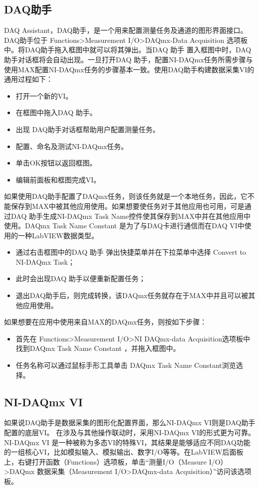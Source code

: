 \subsection{DAQ助手}
DAQ Assistant，DAQ助手，是一个用来配置测量任务及通道的图形界面接口。DAQ助手位于 Functions>Measurement I/O>DAQmx-Data Acquisition 选项板中。将DAQ助手拖入框图中就可以将其弹出。当DAQ 助手 置入框图中时，DAQ助手对话框将会自动出现。一旦打开DAQ 助手，配置NI-DAQmx任务所需步骤与使用MAX配置NI-DAQmx任务的步骤基本一致。使用DAQ助手构建数据采集VI的通用过程如下：
\begin{itemize}
\item 打开一个新的VI。
\item 在框图中拖入DAQ 助手。
\item 出现 DAQ助手对话框帮助用户配置测量任务。
\item 配置、命名及测试NI-DAQmx任务。
\item 单击OK按钮以返回框图。
\item 编辑前面板和框图完成VI。
\end{itemize}

如果使用DAQ助手配置了DAQmx任务，则该任务就是一个本地任务，因此，它不能保存到MAX中被其他应用使用。如果想要使任务对于其他应用也可用，可是通过DAQ 助手生成NI-DAQmx Task Name控件使其保存到MAX中并在其他应用中使用。DAQmx Task Name Constant 是为了与DAQ卡进行通信而在DAQ VI中使用的一种LabVIEW数据类型。

\begin{itemize}
\item 通过右击框图中的DAQ 助手 弹出快捷菜单并在下拉菜单中选择 Convert to NI-DAQmx Task；
\item 此时会出现DAQ 助手以便重新配置任务；
\item 退出DAQ助手后，则完成转换，该DAQmx任务就存在于MAX中并且可以被其他应用使用。
\end{itemize}

如果想要在应用中使用来自MAX的DAQmx任务，则按如下步骤：
\begin{itemize}
\item 首先在 Functions>Measurement I/O>NI DAQmx-data Acquisition选项板中找到DAQmx Task Name Constant ，并拖入框图中。
\item 任务名称可以通过鼠标手形工具单击 DAQmx Task Name Constant浏览选择。
\end{itemize}



\subsection{NI-DAQmx VI}
如果说DAQ助手是数据采集的图形化配置界面，那么NI-DAQmx VI则是DAQ助手配置的底层VI。
在涉及与其他操作联动时，采用NI-DAQmx VI的形式更为可靠。
NI-DAQmx VI 是一种被称为多态VI的特殊VI，其结果是能够适应不同DAQ功能的一组核心VI，比如模拟输入、模拟输出、数字I/O等等。在LabVIEW后面板上，右键打开函数（Functions）选项板，单击“测量I/O（Measure I/O）>DAQmx 数据采集（Measurement I/O>DAQmx-data Acquisition）”访问该选项板。

